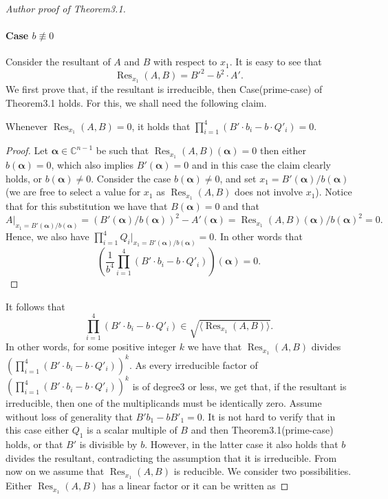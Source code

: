 \begin{proof}[Author proof of Theorem3.1]
\paragraph{Case $b\not\equiv0$}
Consider the resultant of $A$ and $B$ with respect to $x_1$. It is easy to see that
\[\operatorname{Res}_{x_1}(A,B)=B'^2-b^2\cdot A'.\]
We first prove that, if the resultant is irreducible, then Case(prime-case) of Theorem3.1 holds. For this, we shall need the following claim.
\begin{ntclaim}
Whenever $\operatorname{Res}_{x_1}(A,B)=0$, it holds that $\prod_{i=1}^4(B'\cdot b_i-b\cdot Q'_i)=0$.
\end{ntclaim}
\begin{proof}
Let $\boldsymbol\alpha\in\mathbb C^{n-1}$ be such that $\operatorname{Res}_{x_1}(A,B)(\boldsymbol\alpha)=0$ then either $b(\boldsymbol\alpha)=0$, which also implies $B'(\boldsymbol\alpha)=0$ and in this case the claim clearly holds, or $b(\boldsymbol\alpha)\ne0$. Consider the case $b(\boldsymbol\alpha)\ne0$, and set $x_1=B'(\boldsymbol\alpha)/b(\boldsymbol\alpha)$ (we are free to select a value for $x_1$ as $\operatorname{Res}_{x_1}(A,B)$ does not involve $x_1$). Notice that for this substitution we have that $B(\boldsymbol\alpha)=0$ and that
\[A|_{x_1=B'(\boldsymbol\alpha)/b(\boldsymbol\alpha)}=(B'(\boldsymbol\alpha)/b(\boldsymbol\alpha))^2-A'(\boldsymbol\alpha)=\operatorname{Res}_{x_1}(A,B)(\boldsymbol\alpha)/b(\boldsymbol\alpha)^2=0.\]
Hence, we also have $\prod_{i=1}^4Q_i|_{x_1=B'(\boldsymbol\alpha)/b(\boldsymbol\alpha)}=0$. In other words that
\[\left(\frac1{b^4}\prod_{i=1}^4(B'\cdot b_i-b\cdot Q'_i)\right)(\boldsymbol\alpha)=0.\]
\end{proof}
It follows that
\[\prod_{i=1}^4(B'\cdot b_i-b\cdot Q'_i)\in\sqrt{\langle\operatorname{Res}_{x_1}(A,B)\rangle}.\]
In other words, for some positive integer $k$ we have that $\operatorname{Res}_{x_1}(A,B)$ divides $\left(\prod_{i=1}^4(B'\cdot b_i-b\cdot Q'_i)\right)^k$. As every irreducible factor of $\left(\prod_{i=1}^4(B'\cdot b_i-b\cdot Q'_i)\right)^k$ is of degree3 or less, we get that, if the resultant is irreducible, then one of the multiplicands must be identically zero. Assume without loss of generality that $B'b_1-bB'_1=0$. It is not hard to verify that in this case either $Q_1$ is a scalar multiple of $B$ and then Theorem3.1(prime-case) holds, or that $B'$ is divisible by $b$. However, in the latter case it also holds that $b$ divides the resultant, contradicting the assumption that it is irreducible.
From now on we assume that $\operatorname{Res}_{x_1}(A,B)$ is reducible. We consider two possibilities. Either $\operatorname{Res}_{x_1}(A,B)$ has a linear factor or it can be written as

\end{proof}
